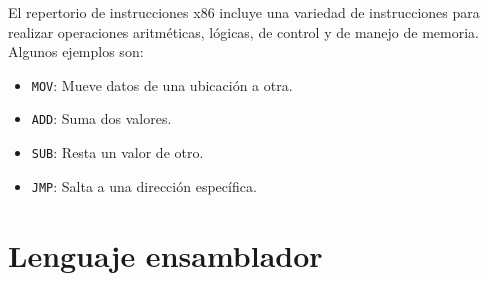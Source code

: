 \documentclass[12pt,twoside]{templates/unerthesis}
\providecommand{\tightlist}{%
  \setlength{\itemsep}{0pt}\setlength{\parskip}{0pt}}
\begin{document}
El repertorio de instrucciones x86 incluye una variedad de instrucciones para realizar operaciones aritméticas, lógicas, de control y de manejo de memoria. Algunos ejemplos son:

\begin{itemize}
\tightlist
\item
  \texttt{MOV}: Mueve datos de una ubicación a otra.
\item
  \texttt{ADD}: Suma dos valores.
\item
  \texttt{SUB}: Resta un valor de otro.
\item
  \texttt{JMP}: Salta a una dirección específica.
\end{itemize}

\hypertarget{lenguaje-ensamblador}{%
\section{Lenguaje ensamblador}\label{lenguaje-ensamblador}}
\end{document}
